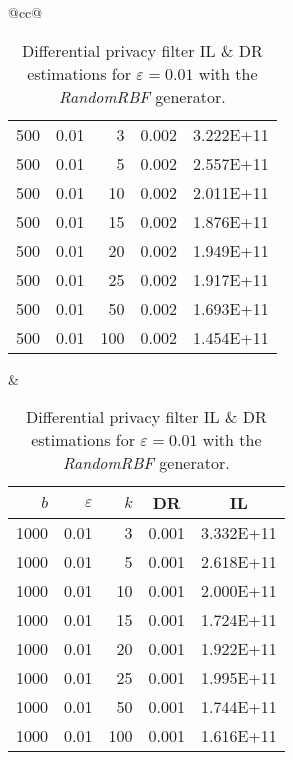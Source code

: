 \begin{table}[H]
\begin{tabular}{@{}cc@{}}
\begin{tabular}{@{}rrrrr@{}}
			500 & 0.01 & 3   & 0.002 & 3.222E+11 \\
			500 & 0.01 & 5   & 0.002 & 2.557E+11 \\
			500 & 0.01 & 10  & 0.002 & 2.011E+11 \\
			500 & 0.01 & 15  & 0.002 & 1.876E+11 \\
			500 & 0.01 & 20  & 0.002 & 1.949E+11 \\
			500 & 0.01 & 25  & 0.002 & 1.917E+11 \\
			500 & 0.01 & 50  & 0.002 & 1.693E+11 \\
			500 & 0.01 & 100 & 0.002 & 1.454E+11 \\ \bottomrule
		\end{tabular}
		&
		\begin{tabular}{@{}rrrrr@{}}
			\toprule
			$b$ & $\varepsilon$ & $k$ & \multicolumn{1}{c}{DR} & \multicolumn{1}{c}{IL} \\ \midrule
			1000 & 0.01 & 3   & 0.001 & 3.332E+11 \\
			1000 & 0.01 & 5   & 0.001 & 2.618E+11 \\
			1000 & 0.01 & 10  & 0.001 & 2.000E+11 \\
			1000 & 0.01 & 15  & 0.001 & 1.724E+11 \\
			1000 & 0.01 & 20  & 0.001 & 1.922E+11 \\
			1000 & 0.01 & 25  & 0.001 & 1.995E+11 \\
			1000 & 0.01 & 50  & 0.001 & 1.744E+11 \\
			1000 & 0.01 & 100 & 0.001 & 1.616E+11 \\ \bottomrule
		\end{tabular}
	\end{tabular}
	\caption[Differential privacy filter DR \& IL estimations (RandomRBF), $\varepsilon = 0.01$.]{Differential privacy filter IL \& DR estimations for $\varepsilon = 0.01$ with the \textit{RandomRBF} generator.}
	\label{table:results-rbf-diff-priv-e0.01}
\end{table}

